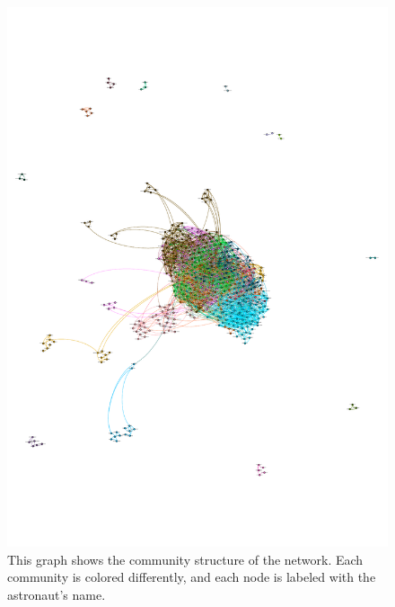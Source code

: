 \documentclass{tufte-handout}
\begin{document}
\begin{figure}[h]
  \includegraphics[width=\linewidth]{modularity.pdf}%
  \caption{This graph shows the community structure of the network. Each community is colored differently, and each node is labeled with the astronaut's name.
  }%
  \label{fig:fullfig}%
\end{figure}

\end{document}
